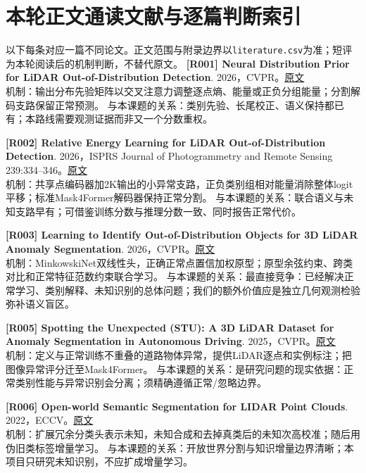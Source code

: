\documentclass[11pt,a4paper]{article}
\begin{document}
\section*{本轮正文通读文献与逐篇判断索引}
以下每条对应一篇不同论文。正文范围与附录边界以\texttt{literature.csv}为准；短评为本轮阅读后的机制判断，不替代原文。
\begingroup\small\setlength{\parindent}{0pt}
\hypertarget{R001}{}\textbf{[R001] Neural Distribution Prior for LiDAR Out-of-Distribution Detection}. 2026，CVPR。\href{https://arxiv.org/html/2604.09232v2}{原文}\\
机制：输出分布先验矩阵以交叉注意力调整逐点熵、能量或正负分组能量；分割解码支路保留正常预测。 与本课题的关系：类别先验、长尾校正、语义保持都已有；本路线需要观测证据而非又一个分数重权。\par\medskip
\hypertarget{R002}{}\textbf{[R002] Relative Energy Learning for LiDAR Out-of-Distribution Detection}. 2026，ISPRS Journal of Photogrammetry and Remote Sensing 239:334–346。\href{https://arxiv.org/html/2511.06720v1}{原文}\\
机制：共享点编码器加2K输出的小异常支路，正负类别组相对能量消除整体logit平移；标准Mask4Former解码器保持正常分割。 与本课题的关系：联合语义与未知支路早有；可借鉴训练分数与推理分数一致、同时报告正常代价。\par\medskip
\hypertarget{R003}{}\textbf{[R003] Learning to Identify Out-of-Distribution Objects for 3D LiDAR Anomaly Segmentation}. 2026，CVPR。\href{https://arxiv.org/html/2604.23604}{原文}\\
机制：MinkowskiNet双线性头，正确正常点置信加权原型；原型余弦约束、跨类对比和正常特征范数约束联合学习。 与本课题的关系：最直接竞争：已经解决正常学习、类别解释、未知识别的总体问题；我们的额外价值应是独立几何观测检验弥补语义盲区。\par\medskip
\hypertarget{R005}{}\textbf{[R005] Spotting the Unexpected (STU): A 3D LiDAR Dataset for Anomaly Segmentation in Autonomous Driving}. 2025，CVPR。\href{https://arxiv.org/html/2505.02148}{原文}\\
机制：定义与正常训练不重叠的道路物体异常，提供LiDAR逐点和实例标注；把图像异常评分迁至Mask4Former。 与本课题的关系：是研究问题的现实依据：正常类别性能与异常识别会分离；须精确遵循正常/忽略边界。\par\medskip
\hypertarget{R006}{}\textbf{[R006] Open-world Semantic Segmentation for LIDAR Point Clouds}. 2022，ECCV。\href{https://arxiv.org/html/2207.01452}{原文}\\
机制：扩展冗余分类头表示未知，未知合成和去掉真类后的未知次高校准；随后用伪旧类标签增量学习。 与本课题的关系：开放世界分割与知识增量边界清晰；本项目只研究未知识别，不应扩成增量学习。\par\medskip
\end{document}
